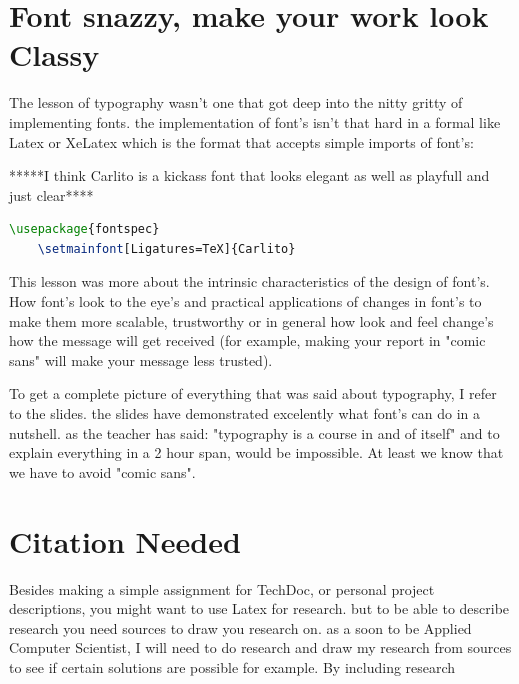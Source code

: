 \documentclass{article}
\begin{document}
\newpage
\section{Font snazzy, make your work look Classy}
The lesson of typography wasn't one that got deep into the nitty gritty of implementing fonts. the implementation of font's isn't that hard in a formal like Latex or XeLatex which is the format that accepts simple imports of font's:

\scriptsize{*****I think Carlito is a kickass font that looks elegant as well as playfull and just clear****}
\normalsize
\begin{lstlisting}[language=tex]
	\usepackage{fontspec}
	\setmainfont[Ligatures=TeX]{Carlito}
\end{lstlisting}

This lesson was more about the intrinsic characteristics of the design of font's. How font's look to the eye's and practical applications of changes in font's to make them more scalable, trustworthy or in general how look and feel change's how the message will get received (for example, making your report in "comic sans" will make your message less trusted).

To get a complete picture of everything that was said about typography, I refer to the slides. the slides have demonstrated excelently what font's can do in a nutshell. as the teacher has said: "typography is a course in and of itself" and to explain everything in a 2 hour span, would be impossible. At least we know that we have to avoid "comic sans".



\section{Citation Needed}
Besides making a simple assignment for TechDoc, or personal project descriptions, you might want to use Latex for research. but to be able to describe research you need sources to draw you research on. as a soon to be Applied Computer Scientist, I will need to do research and draw my research from sources to see if certain solutions are possible for example. By including research

\cite{7794296}
\cite{Jansen:2013:AAH:2492494.2501877}
\cite{mccammon2002high}
\end{document}
